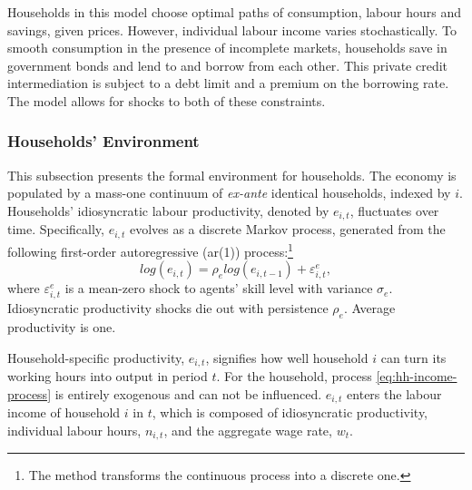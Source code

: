 \documentclass[a4paper,12pt]{article} %
\numberwithin{equation}{section} %
\numberwithin{figure}{section}
\numberwithin{table}{section}
\begin{document}
Households in this model choose optimal paths of consumption, labour hours and savings, given prices. However, individual labour income varies stochastically. To smooth consumption in the presence of incomplete markets, households save in government bonds and lend to and borrow from each other. This private credit intermediation is subject to a debt limit and a premium on the borrowing rate. The model allows for shocks to both of these constraints.

\subsubsection{Households' Environment}
\label{sec:model-hh-environment}

This subsection presents the formal environment for households. The economy is populated by a mass-one continuum of \textit{ex-ante} identical households, indexed by $i$. Households' idiosyncratic labour productivity, denoted by $e_{i,t}$, fluctuates over time. Specifically, $e_{i,t}$ evolves as a discrete Markov process, generated from the following first-order autoregressive (\Gls{ar}(1)) process:\footnote{The \textcite{rouwenhorst1995} method transforms the continuous process into a discrete one.}
\begin{equation}
    log(e_{i,t}) = \rho_e log(e_{i,t-1}) + \varepsilon^e_{i,t}, \label{eq:hh-income-process}
\end{equation}
where $\varepsilon^e_{i,t}$ is a mean-zero shock to agents' skill level with variance $\sigma_e$. Idiosyncratic productivity shocks die out with persistence $\rho_e$. Average productivity is one. %

Household-specific productivity, $e_{i,t}$, signifies how well household $i$ can turn its working hours into output in period $t$. For the household, process \eqref{eq:hh-income-process} is entirely exogenous and can not be influenced. $e_{i,t}$ enters the labour income of household $i$ in $t$, which is composed of idiosyncratic productivity, individual labour hours, $n_{i,t}$, and the aggregate wage rate, $w_t$.
\end{document}
